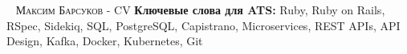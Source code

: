 
\makecvfooterwithkeywords
   {\textsc{\russiancurrentmonth \ \the\year{}}}
   {\textsc{Максим Барсуков - CV}}
   {\thepage}
   {\textbf{Ключевые слова для ATS:} Ruby, Ruby on Rails, RSpec, Sidekiq, SQL, PostgreSQL, Capistrano,
                                     Microservices, REST APIs, API Design, Kafka, Docker, Kubernetes, Git}
